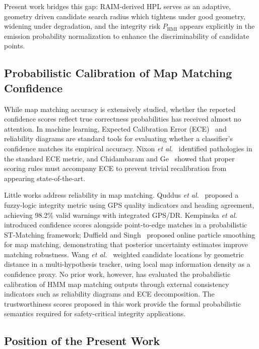 \documentclass[letterpaper,journal]{IEEEtran}
\begin{document}
Present work bridges this gap: RAIM-derived HPL serves as an adaptive,
geometry driven candidate search radius which tightens under good geometry, widening
under degradation, and the integrity risk $P_{\text{HMI}}$ appears explicitly
in the emission probability normalization to enhance the discriminability of candidate points.

\subsection{Probabilistic Calibration of Map Matching Confidence}

While map matching accuracy is extensively studied, whether the reported
confidence scores reflect true correctness probabilities has received almost
no attention. In machine learning, Expected Calibration Error
(ECE)~\cite{Guo2017} and reliability diagrams are standard tools for
evaluating whether a classifier's confidence matches its empirical accuracy.
Nixon \emph{et al.}~\cite{Nixon2019} identified pathologies in the
standard ECE metric, and Chidambaram and Ge~\cite{Chidambaram2025} showed that
proper scoring rules must accompany ECE to prevent trivial recalibration
from appearing state-of-the-art.

Little works address reliability in map matching.  Quddus
\emph{et al.}~\cite{Quddus2006} proposed a fuzzy-logic integrity metric
 using GPS quality indicators and heading agreement, achieving
98.2\% valid warnings with integrated GPS/DR. Kempinska \emph{et
al.}~\cite{Kempinska2017} introduced confidence scores alongside
point-to-edge matches in a probabilistic ST-Matching framework; Duffield and
Singh~\cite{Duffield2020} proposed online particle smoothing for map matching,
demonstrating that posterior uncertainty estimates improve matching
robustness.  Wang
\emph{et al.}~\cite{Wang2023_PMHT} weighted candidate locations by geometric
distance in a multi-hypothesis tracker, using local map information density
as a confidence proxy. No prior work, however, has evaluated the 
probabilistic calibration of HMM map matching outputs through external 
consistency indicators such as reliability diagrams and ECE decomposition.  
The trustworthiness scores proposed in this work provide the formal probabilistic 
semantics required for safety-critical integrity applications.

\subsection{Position of the Present Work}
\end{document}
